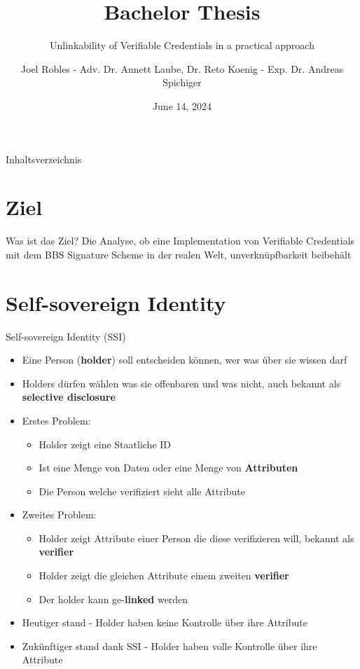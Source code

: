 \documentclass[
	ngerman,%
	authorontitle=true,
	]{bfhbeamer}
\title{Bachelor Thesis}
\subtitle{Unlinkability of Verifiable Credentials in a practical approach}
\author[J. Robles]{Joel Robles - Adv. Dr. Annett Laube, Dr. Reto Koenig - Exp. Dr. Andreas Spichiger}
\institute{TI}
\date{June 14, 2024}
\begin{document}
\maketitle

\begin{frame}{Inhaltsverzeichnis}
    \tableofcontents
\end{frame}

\section{Ziel}

\begin{frame}{Was ist das Ziel?}
    \centering
    Die Analyse, ob eine Implementation von Verifiable Credentials mit dem BBS Signature Scheme in der realen Welt, unverknüpfbarkeit beibehält
\end{frame}

\section{Self-sovereign Identity}

\begin{frame}{Self-sovereign Identity (SSI)}
    \begin{itemize}
        \item Eine Person (\textbf{holder}) soll entscheiden können, wer was über sie wissen darf
        \item Holders dürfen wählen was sie offenbaren und was nicht, auch bekannt als \textbf{selective disclosure}
        \item Erstes Problem:
        \begin{itemize}
            \item Holder zeigt eine Staatliche ID
            \item Ist eine Menge von Daten oder eine Menge von \textbf{Attributen}
            \item Die Person welche verifiziert sieht alle Attribute
        \end{itemize}
        \item Zweites Problem:
        \begin{itemize}
            \item Holder zeigt Attribute einer Person die diese verifizieren will, bekannt als \textbf{verifier}
            \item Holder zeigt die gleichen Attribute einem zweiten \textbf{verifier}
            \item Der holder kann ge-\textbf{linked} werden
        \end{itemize}
        \item Heutiger stand - Holder haben keine Kontrolle über ihre Attribute
        \item Zukünftiger stand dank SSI - Holder haben volle Kontrolle über ihre Attribute
    \end{itemize}
\end{frame}
\end{document}
